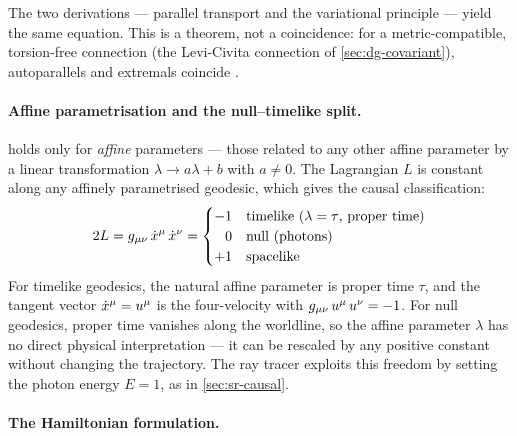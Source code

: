 The two derivations --- parallel transport and the variational principle ---
yield the same equation.  This is a theorem, not a coincidence: for a
metric-compatible, torsion-free connection (the Levi-Civita connection of
\cref{sec:dg-covariant}), autoparallels and extremals coincide
\cite{Carroll2004}.

\paragraph{Affine parametrisation and the null--timelike split.}

 holds only for \emph{affine} parameters --- those related
to any other affine parameter by a linear transformation
$\lambda \to a\lambda + b$ with $a \neq 0$.  The Lagrangian $L$ is constant
along any affinely parametrised geodesic, which gives the causal
classification:
%
\begin{equation}
  2L = g_{\mu\nu}\,\dot{x}^\mu\,\dot{x}^\nu =
  \begin{cases}
    -1 & \text{timelike ($\lambda = \tau$, proper time)} \\
    \phantom{-}0 & \text{null (photons)} \\
    +1 & \text{spacelike}
  \end{cases}
  \label{eq:geodesic-constraint}
\end{equation}
%
For timelike geodesics, the natural affine parameter is proper time $\tau$, and
the tangent vector $\dot{x}^\mu = u^{\mu}$ is the four-velocity with
$g_{\mu\nu}\,u^\mu\,u^\nu = -1$.  For null geodesics, proper time vanishes along
the worldline, so the affine parameter $\lambda$ has no direct physical
interpretation --- it can be rescaled by any positive constant without changing
the trajectory.  The ray tracer exploits this freedom by setting the photon
energy $E = 1$, as in \cref{sec:sr-causal}.

\paragraph{The Hamiltonian formulation.}

